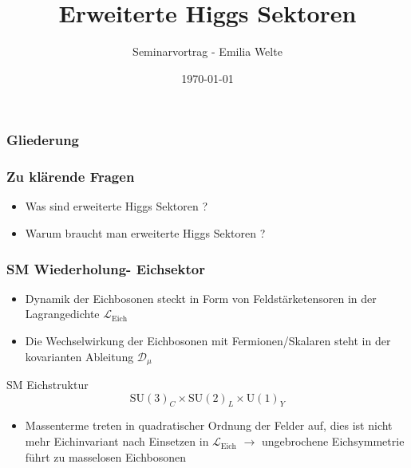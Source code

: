 \documentclass{beamer}
\title{Erweiterte Higgs Sektoren}
\author{Seminarvortrag - Emilia Welte}
\date{ \today}
\begin{document}
\begin{frame} 
\titlepage
\end{frame}


\begin{frame}[t]
\frametitle{Gliederung}
\tableofcontents
\end{frame}

\begin{frame}
\frametitle{Zu klärende Fragen}
\begin{itemize}
\item Was sind erweiterte Higgs Sektoren ?
\item Warum braucht man erweiterte Higgs Sektoren ?
\end{itemize}
\end{frame}

\begin{frame}

\frametitle{SM Wiederholung- Eichsektor}
\begin{itemize}
\item Dynamik der Eichbosonen steckt in Form von Feldstärketensoren in der Lagrangedichte $\mathscr{L}_{\text{Eich}}$
\item Die Wechselwirkung der Eichbosonen mit Fermionen/Skalaren steht in der kovarianten Ableitung $\mathscr{D}_{\mu}$
\end{itemize}

\begin{block}{SM Eichstruktur}
\begin{equation*}
\text{SU}(3)_{C}\times \text{SU}(2)_{L} \times \text{U}(1)_{Y} 
\end{equation*}
\end{block}

\begin{itemize}
\item Massenterme treten in quadratischer Ordnung der Felder auf, dies ist nicht mehr Eichinvariant nach Einsetzen in $\mathscr{L}_{\text{Eich}}$ $\rightarrow$ ungebrochene Eichsymmetrie führt zu masselosen Eichbosonen
\end{itemize}

\end{frame}
\end{document}
